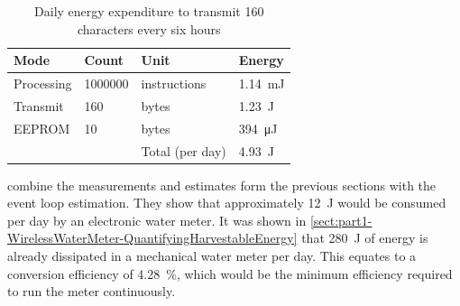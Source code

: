     \begin{table}
      \centering
      \begin{tabular}{|l|l|l|l|}
        \hline
        Mode & Count & Unit & Energy \\ \hline
        Processing & 1000000 & instructions & \SI{1.14}{\milli\joule} \\
        Transmit & 160 & bytes & \SI{1.23}{\joule} \\
        EEPROM & 10 & bytes & \SI{394}{\micro\joule} \\ \hline \hline
        &&Total (per day) & \SI{4.93}{\joule} \\ \hline
      \end{tabular}
      \caption{\label{tab:EnergyBudget-Transmission}Daily energy expenditure to transmit 160 characters every six hours}
    \end{table}

     combine the measurements and estimates form the previous sections with the event loop estimation.
    They show that approximately \SI{12}{\joule} would be consumed per day by an electronic water meter.
    It was shown in \cref{sect:part1-WirelessWaterMeter-QuantifyingHarvestableEnergy} that \SI{280}{\joule} of energy is already dissipated in a mechanical water meter per day.
    This equates to a conversion efficiency of \SI{4.28}{\percent}, which would be the minimum efficiency required to run the meter continuously.
